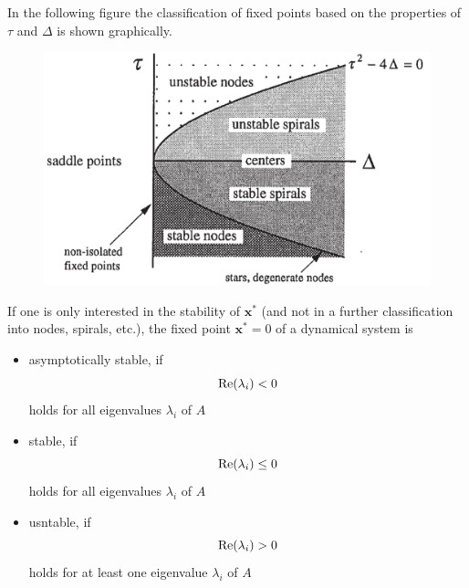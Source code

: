 In the following figure the classification of fixed points based on the properties of $\tau$ and $\Delta$ is shown graphically.
\begin{figure}[H]
  \centering
  \includegraphics[width=.7\linewidth]{Pics/4.19.png}
\end{figure}

If one is only interested in the stability of $\textbf{x}^*$ (and not in a further classification into nodes,
spirals, etc.), the fixed point $\textbf{x}^* = 0$ of a dynamical system is
\begin{itemize}
  \item asymptotically stable, if
  \begin{equation}
    \textup{Re}(\lambda_i) < 0
  \end{equation}
  holds for all eigenvalues $\lambda_i$ of $A$

  \item stable, if
  \begin{equation}
    \textup{Re}(\lambda_i) \leq 0
  \end{equation}
  holds for all eigenvalues $\lambda_i$ of $A$

  \item usntable, if
  \begin{equation}
    \textup{Re}(\lambda_i) > 0
  \end{equation}
  holds for at least one eigenvalue $\lambda_i$ of $A$
\end{itemize}

